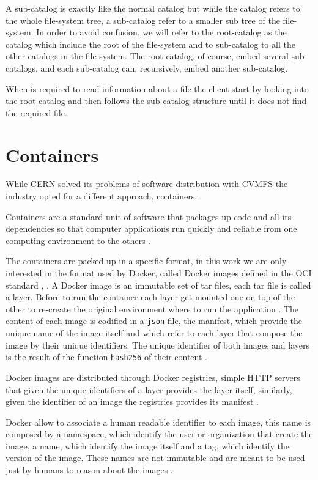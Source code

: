 A sub-catalog is exactly like the normal catalog but while the catalog refers
to the whole file-system tree, a sub-catalog refer to a smaller sub tree of the
file-system. In order to avoid confusion, we will refer to the root-catalog as
the catalog which include the root of the file-system and to sub-catalog to all
the other catalogs in the file-system. The root-catalog, of course, embed
several sub-catalogs, and each sub-catalog can, recursively, embed another
sub-catalog.

When is required to read information about a file the client start by looking
into the root catalog and then follows the sub-catalog structure until it does
not find the required file.

\section{Containers}
\label{sec:containers}

While CERN solved its problems of software distribution with CVMFS the industry
opted for a different approach, containers.

Containers are a standard unit of software that packages up code and all its
dependencies so that computer applications run quickly and reliable from one
computing environment to the others \cite{docker:what}.

The containers are packed up in a specific format, in this work we are only
interested in the format used by Docker, called Docker images defined in the
OCI standard \cite{oci}, \cite{oci:image-spec}. A Docker image is an immutable
set of tar files, each tar file is called a layer. Before to run the container
each layer get mounted one on top of the other to re-create the original
environment where to run the application \cite{oci:image-filesystem}. The
content of each image is codified in a \texttt{json} file, the manifest, which
provide the unique name of the image itself and which refer to each layer that
compose the image by their unique identifiers. The unique identifier of both
images and layers is the result of the function \texttt{hash256} of their
content \cite{oci:content}. 

Docker images are distributed through Docker registries, simple HTTP servers
that given the unique identifiers of a layer provides the layer itself,
similarly, given the identifier of an image the registries provides its
manifest \cite{docker:registry}.

Docker allow to associate a human readable identifier to each image, this name
is composed by a namespace, which identify the user or organization that create
the image, a name, which identify the image itself and a tag, which identify
the version of the image. These names are not immutable and are meant to be
used just by humans to reason about the images \cite{docker:tag}.

